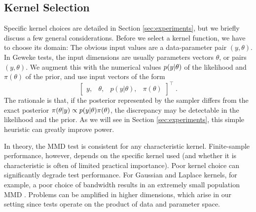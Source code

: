 \documentclass{article}
\newcommand{\tildepi}{\tilde{\pi}}
\begin{document}
\subsection{Kernel Selection}\label{sec:kernel_selection}
Specific kernel choices are detailed in Section \ref{sec:experiments}, but we briefly discuss a few general considerations.
Before we select a kernel function, we have to choose its domain:
The obvious input values are a data-parameter pair $(y,\theta)$. In Geweke tests, the input dimensions are usually parameters vectors $\theta$, or pairs $(y,\theta)$. We augment this with the numerical values $p(y\vert\theta)$ of the likelihood and $\pi(\theta)$ of the prior, and use input vectors of the form
\[\begin{bmatrix}y,&\theta, & p(y|\theta), & \pi(\theta) \end{bmatrix}^{\top}\;.\]
The rationale is that, if the posterior represented by the sampler differs from the exact posterior $\pi(\theta|y) \propto p(y\vert \theta)\pi(\theta)$, the discrepancy may be detectable in the likelihood and the prior. As we will see in Section \ref{sec:experiments}, this simple heuristic can greatly improve power.

In theory, the MMD test is consistent for any characteristic kernel. Finite-sample performance, however, depends on the specific kernel used (and whether it is characteristic is often of limited practical importance). Poor kernel choice can significantly degrade test performance. For Gaussian and Laplace kernels, for example, a poor choice of bandwidth results in an extremely small population MMD \citep{reddi_decreasing_2014}. Problems can be amplified in higher dimensions, which arise in our setting since tests operate on the product of data and parameter space.
\end{document}
